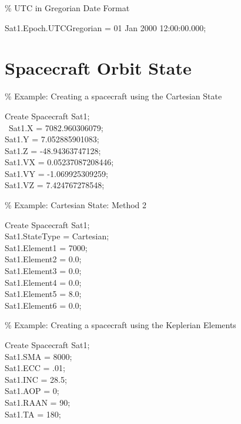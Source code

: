 \noindent \% UTC in Gregorian Date Format\\
\begin{ScriptType} Sat1.Epoch.UTCGregorian  = 01 Jan
2000 12:00:00.000;  \end{ScriptType}

\section{Spacecraft Orbit State}

\%  Example: Creating a spacecraft using  the
Cartesian State\\
\begin{ScriptType}
Create Spacecraft Sat1;\\\
Sat1.X = 7082.960306079;\\
Sat1.Y = 7.052885901083;\\
Sat1.Z = -48.94363747128;\\
Sat1.VX = 0.05237087208446;\\
Sat1.VY = -1.069925309259;\\
Sat1.VZ = 7.424767278548;
\end{ScriptType}

\%  Example: Cartesian State: Method 2 \\
\begin{ScriptType}
Create Spacecraft Sat1;\\
Sat1.StateType = Cartesian;\\
Sat1.Element1 = 7000; \\   %
Sat1.Element2 = 0.0;  \\  %
Sat1.Element3 = 0.0;  \\   %
Sat1.Element4 = 0.0;  \\   %
Sat1.Element5 = 8.0;  \\   %
Sat1.Element6 = 0.0;  \\   %
\end{ScriptType}

\noindent \%  Example: Creating a spacecraft using  the
Keplerian Elements\\
\begin{ScriptType}
Create Spacecraft Sat1;\\
Sat1.SMA        = 8000;\\
Sat1.ECC        = .01;\\
Sat1.INC        = 28.5;\\
Sat1.AOP = 0; \\
Sat1.RAAN = 90;\\
Sat1.TA         = 180; \\    %
\end{ScriptType}

